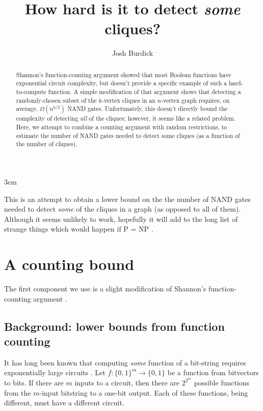 \documentclass[12pt]{article}
\theoremstyle{definition}
\begin{document}
\emergencystretch 3em
\title{How hard is it to detect {\em some} cliques?}

\author{Josh Burdick}

\maketitle

\begin{abstract}
Shannon's function-counting argument
\cite{shannon_synthesis_1949} showed that most Boolean functions have
exponential circuit complexity, but doesn't provide a specific example
of such a hard-to-compute function. A simple modification of that argument
shows that detecting a randomly-chosen subset of the $k$-vertex cliques in an
$n$-vertex graph requires, on average, $\Omega(n^{k/2})$ NAND gates.
Unfortunately,
this doesn't directly bound the complexity of detecting {\em all} of the cliques;
however, it seems like a related problem.
Here, we attempt to combine a counting argument with
random restrictions, to estimate the number
of NAND gates needed to detect some cliques (as a function
of the number of cliques).
\end{abstract}

\newpage

\tableofcontents

This is an attempt to obtain a lower bound on the the number of NAND gates
needed to detect {\em some} of the cliques in a graph (as opposed to
all of them).
Although it seems unlikely to work, hopefully
it will add to the long list of strange things which would happen
if P = NP \cite{fenner1996complexity}.

\section{A counting bound}
\label{countingBound}

The first component we use is a slight modification
of Shannon's function-counting argument
\cite{shannon_synthesis_1949}.

\subsection{Background: lower bounds from function counting}

It has long been known that computing {\em some} function of a bit-string
requires exponentially large circuits \cite{shannon_synthesis_1949}.
Let $f: \{0,1\}^m \rightarrow \{0,1\}$ be a function from bitvectors to bits.
If there are $m$ inputs to a circuit,
then there are $2^{2^m}$ possible functions from the $m$-input bitstring to
a one-bit output.
Each of these functions, being different, must have a
different circuit.
\end{document}

